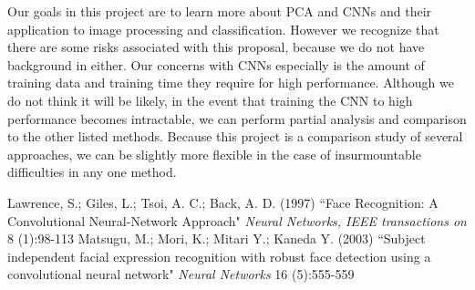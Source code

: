 \documentclass[11pt, twoside]{article}
\begin{document}
Our goals in this project are to learn more about PCA and CNNs and their
application to image processing and classification. However we recognize
that there are some risks associated with this proposal, because we do
not have background in either. Our concerns with CNNs especially is the
amount of training data and training time they require for high performance.
Although we do not think it will be likely, in the event that training the
CNN to high performance becomes intractable, we can perform partial analysis
and comparison to the other listed methods. Because this project is a
comparison study of several approaches, we can be slightly more flexible
in the case of insurmountable difficulties in any one method.

\begin{thebibliography}{9}
Lawrence, S.; Giles, L.; Tsoi, A. C.; Back, A. D. (1997)
``Face Recognition: A Convolutional Neural-Network Approach"
\textit{Neural Networks, IEEE transactions on} 8 (1):98-113
Matsugu, M.; Mori, K.; Mitari Y.; Kaneda Y. (2003)
``Subject independent facial expression recognition with robust face detection using a convolutional neural network"
\textit{Neural Networks} 16 (5):555-559
\end{thebibliography}
\end{document}
